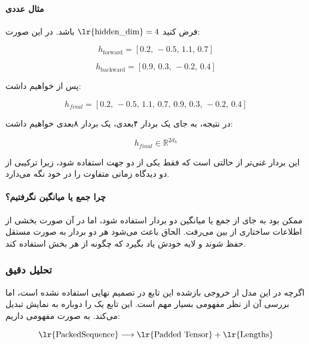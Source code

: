 \documentclass{article}
\begin{document}
\paragraph{مثال عددی}
فرض کنید \(\text{\lr{hidden\_dim}}=4\) باشد. در این صورت:

\begin{equation}
	h_{\text{forward}} = [0.2,\,-0.5,\,1.1,\,0.7]
\end{equation}

\begin{equation}
	h_{\text{backward}} = [0.9,\,0.3,\,-0.2,\,0.4]
\end{equation}

پس از  خواهیم داشت:

\begin{equation}
	h_{final} = [0.2,\,-0.5,\,1.1,\,0.7,\,0.9,\,0.3,\,-0.2,\,0.4]
\end{equation}

در نتیجه، به جای یک بردار ۴بعدی، یک بردار ۸بعدی خواهیم داشت:

\begin{equation}
	h_{final} \in \mathbb{R}^{2d_h}
\end{equation}

این بردار غنی‌تر از حالتی است که فقط یکی از دو جهت استفاده شود، زیرا ترکیبی از دو دیدگاه زمانی متفاوت را در خود نگه می‌دارد.

\paragraph{چرا جمع یا میانگین نگرفتیم؟}
ممکن بود به جای  از جمع یا میانگین دو بردار استفاده شود، اما در آن صورت بخشی از اطلاعات ساختاری از بین می‌رفت. الحاق باعث می‌شود هر دو بردار به صورت مستقل حفظ شوند و لایه  خودش یاد بگیرد که چگونه از هر بخش استفاده کند.

\subsubsection{تحلیل دقیق }

اگرچه در این مدل از خروجی بازشده این تابع در تصمیم نهایی استفاده نشده است، اما بررسی آن از نظر مفهومی بسیار مهم است. این تابع یک  را دوباره به نمایش  تبدیل می‌کند. به صورت مفهومی داریم:

\begin{equation}
	\text{\lr{PackedSequence}} \longrightarrow \text{\lr{Padded Tensor}} + \text{\lr{Lengths}}
\end{equation}
\end{document}
